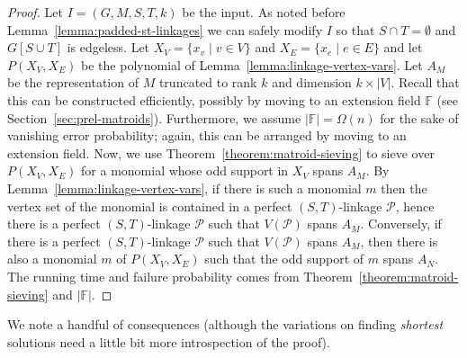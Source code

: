 \documentclass[10pt,a4paper]{article}
\newcommand{\F}{\ensuremath{\mathbb F}\xspace}
\newcommand{\cP}{\ensuremath{\mathcal P}\xspace}
\begin{document}
\begin{proof} 
  Let $I=(G, M, S, T, k)$ be the input. As noted before Lemma~\ref{lemma:padded-st-linkages}
  we can safely modify $I$ so that $S \cap T = \emptyset$
  and $G[S \cup T]$ is edgeless. 
  Let $X_V=\{x_v \mid v \in V\}$ and $X_E=\{x_e \mid e \in E\}$
  and let $P(X_V,X_E)$ be the polynomial of Lemma~\ref{lemma:linkage-vertex-vars}.
  Let $A_M$ be the representation of $M$ truncated to rank $k$
  and dimension $k \times |V|$. 
  Recall that this can be constructed efficiently, possibly by moving
  to an extension field $\F$ (see Section~\ref{sec:prel-matroids}). 
  Furthermore, we assume $|\F| = \Omega(n)$ for the sake of vanishing
  error probability; again, this can be arranged by moving to an
  extension field. Now, we use Theorem~\ref{theorem:matroid-sieving} to
  sieve over $P(X_V,X_E)$ for a monomial whose odd support in $X_V$
  spans $A_M$. By Lemma~\ref{lemma:linkage-vertex-vars}, if
  there is such a monomial $m$ then the vertex set of the monomial is
  contained in a perfect $(S,T)$-linkage $\cP$, hence there is a
  perfect $(S,T)$-linkage $\cP$ such that $V(\cP)$ spans $A_M$.
  Conversely, if there is a perfect $(S,T)$-linkage $\cP$ such that
  $V(\cP)$ spans $A_M$, then there is also a monomial $m$ of
  $P(X_V,X_E)$ such that the odd support of $m$ spans $A_N$.
  The running time and failure probability comes from
  Theorem~\ref{theorem:matroid-sieving} and $|\F|$. 
\end{proof}

We note a handful of consequences (although the variations on finding 
\emph{shortest} solutions need a little bit more introspection of the proof).
\end{document}
